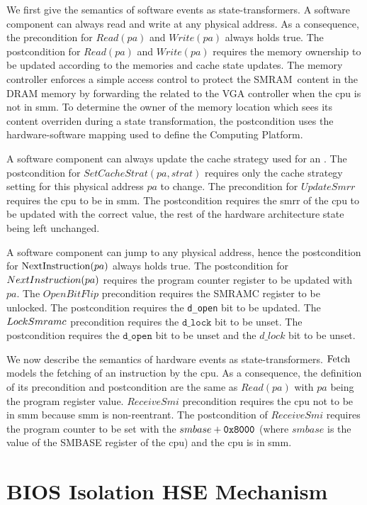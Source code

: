 We first give the semantics of software events as state-transformers.
%
A software component can always read and write at any physical address.
%
As a consequence, the precondition for $Read(pa)$ and $Write(pa)$ always holds
true.
%
The postcondition for $Read(pa)$ and $Write(pa)$ requires the memory ownership
to be updated according to the memories and cache state updates.
%
The memory controller enforces a simple access control to protect the
SMRAM content in the DRAM memory by forwarding the related \IO to the VGA
controller when the \ac{cpu} is not in \ac{smm}.
%
To determine the owner of the memory location which sees its content overriden
during a state transformation, the postcondition uses the hardware-software
mapping used to define the Computing Platform.

A software component can always update the cache strategy used for an \IO.
%
The postcondition for $SetCacheStrat(pa,strat)$ requires only the cache strategy
setting for this physical address $pa$ to change.
%
The precondition for $UpdateSmrr$ requires the \ac{cpu} to be in \ac{smm}.
%
The postcondition requires the \ac{smrr} of the \ac{cpu} to be updated with the
correct value, the rest of the hardware architecture state being left unchanged.

A software component can jump to any physical address, hence the postcondition
for $\mathrm{NextInstru\-ction}(pa)$ always holds true.
%
The postcondition for $NextInstru\-ction(pa)$ requires the program counter
register to be updated with $pa$. The $OpenBitFlip$ precondition requires the
SMRAMC register to be unlocked. The postcondition requires the \texttt{d\_open}
bit to be updated. The $Lock\-Smramc$ precondition requires the
$\texttt{d\_lock}$ bit to be unset. The postcondition requires the
$\texttt{d\_open}$ bit to be unset and the $d\_lock$ bit to be unset.

We now describe the semantics of hardware events as state-transformers.
%
$\mathrm{Fetch}$ models the fetching of an instruction by the \ac{cpu}.
%
As a consequence, the definition of its precondition and postcondition are the
same as $Read(pa)$ with $pa$ being the program register value.
%
$ReceiveSmi$ precondition requires the \ac{cpu} not to be in \ac{smm} because
\ac{smm} is non-reentrant.
%
The postcondition of $ReceiveSmi$ requires the program counter to be set with
the $smbase + \mathtt{0x8000}$ (where $smbase$ is the value of the SMBASE register
of the \ac{cpu}) and the \ac{cpu} is in \ac{smm}.


\section{BIOS Isolation HSE Mechanism}
\label{sec:speccert2:smm}

